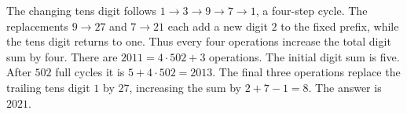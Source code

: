 The changing tens digit follows $1\to3\to9\to7\to1$, a four-step cycle. The replacements $9\to27$ and $7\to21$ each add a new digit $2$ to the fixed prefix, while the tens digit returns to one. Thus every four operations increase the total digit sum by four. There are $2011=4\cdot502+3$ operations. The initial digit sum is five. After $502$ full cycles it is $5+4\cdot502=2013$. The final three operations replace the trailing tens digit $1$ by $27$, increasing the sum by $2+7-1=8$. The answer is $\boxed{2021}$.
